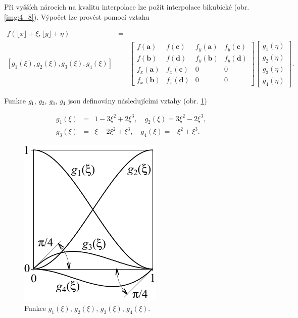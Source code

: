 Při vyšších nárocích na kvalitu interpolace lze požít interpolace bikubické (obr. \ref{img:4_8}). Výpočet lze provést pomocí vztahu

\begin{eqnarray} \label{eq:4_42}
    f( \lfloor x \rfloor + \xi, \lfloor y \rfloor + \eta) &=& \\
    \left[ g_1(\xi), g_2(\xi), g_3(\xi), g_4(\xi) \right] && \left[
    \begin{array}{cccc}
    f(\mathbf{a}) & f(\mathbf{c}) & f_y(\mathbf{a}) & f_y(\mathbf{c}) \\
    f(\mathbf{b}) & f(\mathbf{d}) & f_y(\mathbf{b}) & f_y(\mathbf{d}) \\
    f_x(\mathbf{a}) & f_x(\mathbf{c}) & 0 & 0 \\
    f_x(\mathbf{b}) & f_x(\mathbf{d}) & 0 & 0
    \end{array}
    \right]
    \left[
    \begin{array}{c}
    g_1(\eta) \\
    g_2(\eta) \\
    g_3(\eta) \\
    g_4(\eta)
    \end{array}
    \right]. \nonumber
\end{eqnarray}

\noindent Funkce \textit{g}$_1$, \textit{g}$_2$, \textit{g}$_3$, \textit{g}$_4$ jsou definovány následujícími vztahy (obr. \ref{img:4_9})

\begin{eqnarray} \label{eq:4_43}
    g_1(\xi) &=& 1 - 3 \xi^2 + 2\xi^3, \quad g_2(\xi) = 3\xi^2 - 2\xi^3,\\
    g_3(\xi) &=& \xi - 2 \xi^2 + \xi^3, \quad g_4(\xi) = -\xi^2 + \xi^3. \nonumber
\end{eqnarray}

\begin{figure}[th]
    \begin{center}
        \includegraphics[scale=1.0]{04_digitalizace/images/img_4_9.pdf}
    \end{center}
    \caption{Funkce $g_1(\xi)$, $g_2(\xi)$, $g_3(\xi)$, $g_4(\xi)$.}
    \label{img:4_9}
\end{figure}

